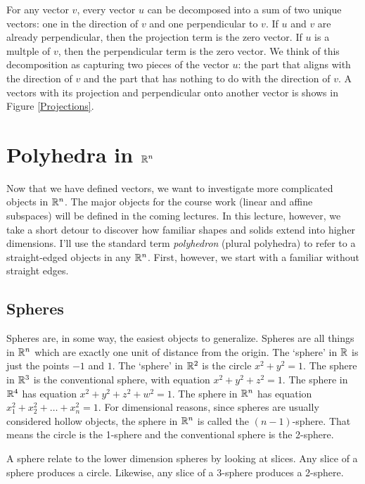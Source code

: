 \documentclass[fleqn]{report}
\begin{document}
For any vector $v$, every vector $u$ can be decomposed into a
sum of two unique vectors: one in the direction of $v$ and one
perpendicular to $v$. If $u$ and $v$ are already
perpendicular, then the projection term is the zero vector. If
$u$ is a multple of $v$, then the perpendicular term is the
zero vector. We think of this decomposition as capturing two
pieces of the vector $u$: the part that aligns with the
direction of $v$ and the part that has nothing to do with the
direction of $v$. A vectors with its projection and
perpendicular onto another vector is shows in Figure
\ref{Projections}. 

\chapter{Polyhedra in $\mathbb{R}^n$}
\label{polyhedra}

Now that we have defined vectors, we want to investigate
more complicated objects in $\mathbb{R}^n$. The major objects for the
course work (linear and affine subspaces) will be defined in
the coming lectures. In this lecture, however, we take a short
detour to discover how familiar shapes and solids extend into
higher dimensions. I'll use the standard term
\emph{polyhedron} (plural polyhedra) to refer to a
straight-edged objects in any $\mathbb{R}^n$. First, however, we
start with a familiar without straight edges.

\section{Spheres}

Spheres are, in some way, the easiest objects to generalize.
Spheres are all things in $\mathbb{R}^n$ which are exactly one unit
of distance from the origin. The `sphere' in $\mathbb{R}$ is just
the points $-1$ and $1$. The `sphere' in $\mathbb{R}^2$ is the circle
$x^2 + y^2 = 1$. The sphere in $\mathbb{R}^3$ is the conventional
sphere, with equation $x^2 + y^2 + z^2 = 1$. The sphere in
$\mathbb{R}^4$ has equation $x^2 + y^2 + z^2 + w^2 = 1$. The sphere
in $\mathbb{R}^n$ has equation $x_1^2 + x_2^2 + \ldots + x_n^2 = 1$.
For dimensional reasons, since spheres are usually
considered hollow objects, the sphere in $\mathbb{R}^n$ is
called the $(n-1)$-sphere. That means the circle is the
1-sphere and the conventional sphere is the 2-sphere.

A sphere relate to the lower dimension spheres by looking at
slices. Any slice of a sphere produces a circle. Likewise, any
slice of a 3-sphere produces a 2-sphere.
\clearpage
\end{document}

